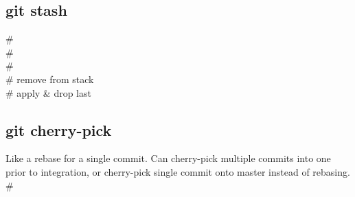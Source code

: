 \subsection*{git stash}
 \# \\
 \# \\
 \# \\
 \# remove from stack \\
 \# apply \& drop last

\subsection*{git cherry-pick}
Like a rebase for a single commit. Can cherry-pick multiple commits into one prior to integration, or cherry-pick single commit onto master instead of rebasing. \\
 \#

